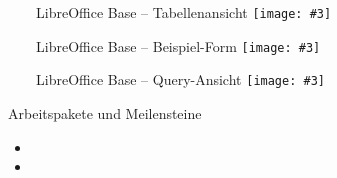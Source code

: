 \documentclass[aspectratio=169]{beamer}
\newcommand{\imageslide}[4][]
{
\begin{frame}[plain]{~~~~#2}
\vspace{0.2em}
\centering\texttt{[image: \#3]}
\\#1
\note{#4}
\end{frame}
}
\begin{document}
\imageslide{LibreOffice Base -- Tabellenansicht}{img_neu/base-tables.png}{}
\imageslide{LibreOffice Base -- Beispiel-Form}{img_neu/base-form.png}{}
\imageslide{LibreOffice Base -- Query-Ansicht}{img_neu/base-query.png}{}

\begin{frame}{Arbeitspakete und Meilensteine}
\begin{itemize}
\item
\item
\end{itemize}
\end{frame}
\fi
\end{document}
